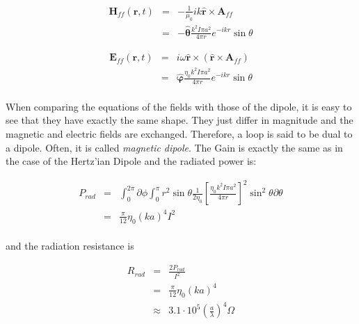 \documentclass[a4paper,10pt]{thesis}
\begin{document}
\begin{eqnarray}
\mathbf{H}_{ff} (\mathbf{r},t)&=& - \frac{1}{\mu_0} ik\mathbf{\hat{r}} \times \mathbf{A}_{ff} \label{Hff_loop}\\
&=& - \mathbf{\hat{\theta}} \frac{k^2 I \pi a^2}{4 \pi r} e^{-ikr} \sin \theta \nonumber
\end{eqnarray}

\begin{eqnarray}
\mathbf{E}_{ff} (\mathbf{r},t)&=& i \omega \mathbf{\hat{r}} \times ( \mathbf{\hat{r}} \times \mathbf{A}_{ff}) \label{Eff_loop} \\
&=& \mathbf{\hat{\varphi}} \frac{\eta_0 k^2 I \pi a^2}{4 \pi r} e^{-ikr} \sin \theta \nonumber
\end{eqnarray}


\paragraph*{}
When comparing the equations of the fields with those of the dipole, it is easy to see that they have exactly the same shape. They just differ in magnitude and the magnetic and electric fields are exchanged. Therefore, a loop is said to be dual to a dipole. Often, it is called \emph{magnetic dipole}. The Gain is exactly the same as in the case of the Hertz'ian Dipole and the radiated power is:

\begin{eqnarray}\label{total_power_loop}
P_{rad}&=& \int_0^{2\pi } \partial \phi \int_0^{\pi} r^2 \sin \theta \frac{1}{2 \eta_0} \left[ \frac{\eta_0 k^2 I \pi a^2}{4 \pi r} \right]^2 \sin^2 \theta \partial \theta  \\
&=& \frac{\pi}{12} \eta_0 (ka)^4 I^2 \nonumber
\end{eqnarray}

\paragraph*{}
and the radiation resistance is

\begin{eqnarray}\label{radiation_resistance_loop}
R_{rad} &=& \frac{2 P_{rad}}{I^2} \\
&=&  \frac{\pi}{12} \eta_0 (ka)^4 \nonumber \\
&\approx& 3.1 \cdot 10^5  \left(\frac{a}{\lambda} \right)^4 \Omega \nonumber
\end{eqnarray}
\end{document}
